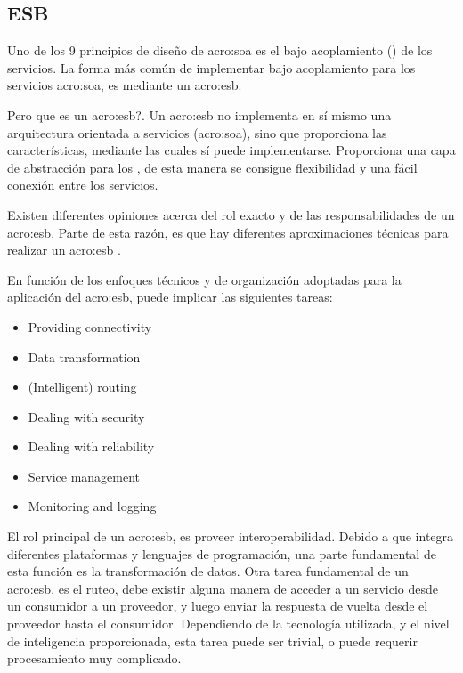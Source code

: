 
\subsection{ESB}
\label{esb:introduccion}


Uno de los 9 principios de diseño de \gls{acro:soa} es el bajo acoplamiento () de los servicios.  La forma más común de implementar bajo acoplamiento para los servicios \gls{acro:soa}, es mediante un \gls{acro:esb}.

Pero que es un \gls{acro:esb}?.  Un \gls{acro:esb} no implementa en sí mismo una arquitectura orientada a servicios (\gls{acro:soa}), sino que proporciona las características, mediante las cuales sí puede implementarse.  Proporciona una capa de abstracción para los , de esta manera se consigue flexibilidad y una fácil conexión entre los servicios.

Existen diferentes opiniones acerca del rol exacto y de las responsabilidades de un \gls{acro:esb}.  Parte de esta razón, es que hay diferentes aproximaciones técnicas para realizar un \gls{acro:esb} \cite[p.~47]{josuttis2007}.

En función de los enfoques técnicos y de organización adoptadas para la aplicación del \gls{acro:esb}, puede implicar las siguientes tareas:

\begin{itemize}
  \item Providing connectivity
  \item Data transformation
  \item (Intelligent) routing
  \item Dealing with security
  \item Dealing with reliability
  \item Service management
  \item Monitoring and logging
\end{itemize}

El rol principal de un \gls{acro:esb}, es proveer interoperabilidad.  Debido a que integra diferentes plataformas y lenguajes de programación, una parte fundamental de esta función es la transformación de datos.
Otra tarea fundamental de un \gls{acro:esb}, es el ruteo, debe existir alguna manera de acceder a un servicio desde un consumidor a un proveedor, y luego enviar la respuesta de vuelta desde el proveedor hasta el consumidor.
Dependiendo de la tecnología utilizada, y el nivel de inteligencia proporcionada, esta tarea puede ser trivial, o puede requerir procesamiento muy complicado.

